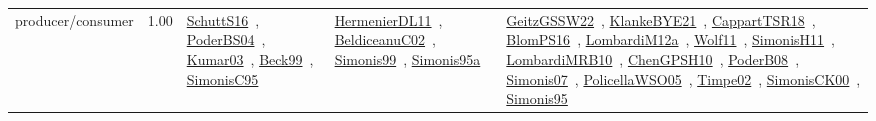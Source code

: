 {\begin{longtable}{p{3cm}r>{\raggedright\arraybackslash}p{6cm}>{\raggedright\arraybackslash}p{6cm}>{\raggedright\arraybackslash}p{8cm}}
\index{producer/consumer}\index{Concepts!producer/consumer}producer/consumer &  1.00 & \href{../works/SchuttS16.pdf}{SchuttS16}~\cite{SchuttS16}, \href{../works/PoderBS04.pdf}{PoderBS04}~\cite{PoderBS04}, \href{../works/Kumar03.pdf}{Kumar03}~\cite{Kumar03}, \href{../works/Beck99.pdf}{Beck99}~\cite{Beck99}, \href{../works/SimonisC95.pdf}{SimonisC95}~\cite{SimonisC95} & \href{../works/HermenierDL11.pdf}{HermenierDL11}~\cite{HermenierDL11}, \href{../works/BeldiceanuC02.pdf}{BeldiceanuC02}~\cite{BeldiceanuC02}, \href{../works/Simonis99.pdf}{Simonis99}~\cite{Simonis99}, \href{../works/Simonis95a.pdf}{Simonis95a}~\cite{Simonis95a} & \href{../works/GeitzGSSW22.pdf}{GeitzGSSW22}~\cite{GeitzGSSW22}, \href{../works/KlankeBYE21.pdf}{KlankeBYE21}~\cite{KlankeBYE21}, \href{../works/CappartTSR18.pdf}{CappartTSR18}~\cite{CappartTSR18}, \href{../works/BlomPS16.pdf}{BlomPS16}~\cite{BlomPS16}, \href{../works/LombardiM12a.pdf}{LombardiM12a}~\cite{LombardiM12a}, \href{../works/Wolf11.pdf}{Wolf11}~\cite{Wolf11}, \href{../works/SimonisH11.pdf}{SimonisH11}~\cite{SimonisH11}, \href{../works/LombardiMRB10.pdf}{LombardiMRB10}~\cite{LombardiMRB10}, \href{../works/ChenGPSH10.pdf}{ChenGPSH10}~\cite{ChenGPSH10}, \href{../works/PoderB08.pdf}{PoderB08}~\cite{PoderB08}, \href{../works/Simonis07.pdf}{Simonis07}~\cite{Simonis07}, \href{../works/PolicellaWSO05.pdf}{PolicellaWSO05}~\cite{PolicellaWSO05}, \href{../works/Timpe02.pdf}{Timpe02}~\cite{Timpe02}, \href{../works/SimonisCK00.pdf}{SimonisCK00}~\cite{SimonisCK00}, \href{../works/Simonis95.pdf}{Simonis95}~\cite{Simonis95}\\

\end{longtable}}
